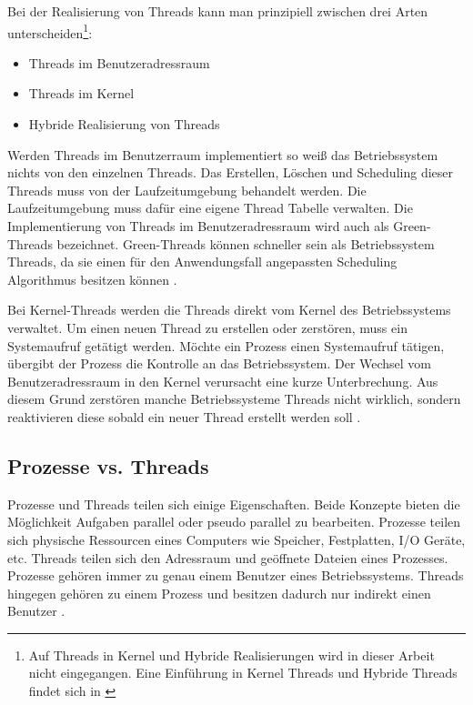 Bei der Realisierung von Threads kann man prinzipiell zwischen drei Arten unterscheiden\footnote{Auf Threads in Kernel und Hybride Realisierungen wird in dieser Arbeit nicht eingegangen. Eine Einführung in Kernel Threads und Hybride Threads findet sich in \cite[p. 109-110]{tan09}}:

\begin{itemize}
  \item Threads im Benutzeradressraum
  \item Threads im Kernel 
  \item Hybride Realisierung von Threads
\end{itemize}

Werden Threads im Benutzerraum implementiert so weiß das Betriebssystem nichts von den einzelnen Threads. Das Erstellen, Löschen und Scheduling dieser Threads muss von der Laufzeitumgebung  behandelt werden. Die Laufzeitumgebung muss dafür eine eigene Thread Tabelle verwalten. Die Implementierung von Threads im Benutzeradressraum wird auch als Green-Threads bezeichnet. Green-Threads können schneller sein als Betriebssystem Threads, da sie einen für den Anwendungsfall angepassten Scheduling Algorithmus besitzen können \cite[p. 106-108]{tan09}.

Bei Kernel-Threads werden die Threads direkt vom Kernel des Betriebssystems verwaltet. Um einen neuen Thread zu erstellen oder zerstören, muss ein Systemaufruf getätigt werden. Möchte ein Prozess einen Systemaufruf tätigen, übergibt der Prozess die Kontrolle an das Betriebssystem. Der Wechsel vom Benutzeradressraum in den Kernel verursacht eine kurze Unterbrechung. Aus diesem Grund zerstören manche Betriebssysteme Threads nicht wirklich, sondern reaktivieren diese sobald ein neuer Thread erstellt werden soll \cite[p. 59, p. 106-108]{tan09}.

\subsection{Prozesse vs. Threads}

Prozesse und Threads teilen sich einige Eigenschaften. Beide Konzepte bieten die Möglichkeit Aufgaben parallel oder pseudo parallel zu bearbeiten. Prozesse teilen sich physische Ressourcen eines Computers wie Speicher, Festplatten, I/O Geräte, etc. Threads teilen sich den Adressraum und geöffnete Dateien eines Prozesses. Prozesse gehören immer zu genau einem Benutzer eines Betriebssystems. Threads hingegen gehören zu einem Prozess und besitzen dadurch nur indirekt einen Benutzer \cite[p. 89]{tan09}. 


